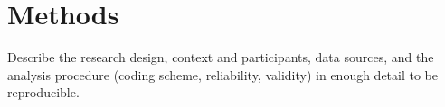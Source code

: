 \section{Methods}\label{sec:methods}


Describe the research design, context and participants, data sources, and the
analysis procedure (coding scheme, reliability, validity) in enough detail to be
reproducible.

